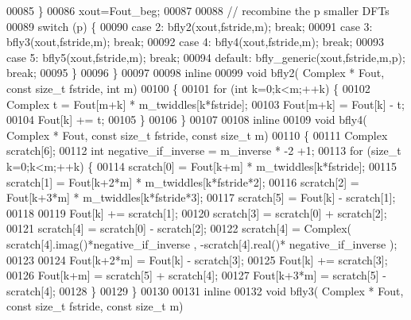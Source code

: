 \begin{DoxyCode}
00085       \}
00086       xout=Fout\_beg;
00087 
00088       \textcolor{comment}{// recombine the p smaller DFTs }
00089       \textcolor{keywordflow}{switch} (p) \{
00090         \textcolor{keywordflow}{case} 2: bfly2(xout,fstride,m); \textcolor{keywordflow}{break};
00091         \textcolor{keywordflow}{case} 3: bfly3(xout,fstride,m); \textcolor{keywordflow}{break};
00092         \textcolor{keywordflow}{case} 4: bfly4(xout,fstride,m); \textcolor{keywordflow}{break};
00093         \textcolor{keywordflow}{case} 5: bfly5(xout,fstride,m); \textcolor{keywordflow}{break};
00094         \textcolor{keywordflow}{default}: bfly\_generic(xout,fstride,m,p); \textcolor{keywordflow}{break};
00095       \}
00096     \}
00097 
00098   \textcolor{keyword}{inline}
00099     \textcolor{keywordtype}{void} bfly2( Complex * Fout, \textcolor{keyword}{const} \textcolor{keywordtype}{size\_t} fstride, \textcolor{keywordtype}{int} m)
00100     \{
00101       \textcolor{keywordflow}{for} (\textcolor{keywordtype}{int} k=0;k<m;++k) \{
00102         Complex t = Fout[m+k] * m\_twiddles[k*fstride];
00103         Fout[m+k] = Fout[k] - t;
00104         Fout[k] += t;
00105       \}
00106     \}
00107 
00108   \textcolor{keyword}{inline}
00109     \textcolor{keywordtype}{void} bfly4( Complex * Fout, \textcolor{keyword}{const} \textcolor{keywordtype}{size\_t} fstride, \textcolor{keyword}{const} \textcolor{keywordtype}{size\_t} m)
00110     \{
00111       Complex scratch[6];
00112       \textcolor{keywordtype}{int} negative\_if\_inverse = m\_inverse * -2 +1;
00113       \textcolor{keywordflow}{for} (\textcolor{keywordtype}{size\_t} k=0;k<m;++k) \{
00114         scratch[0] = Fout[k+m] * m\_twiddles[k*fstride];
00115         scratch[1] = Fout[k+2*m] * m\_twiddles[k*fstride*2];
00116         scratch[2] = Fout[k+3*m] * m\_twiddles[k*fstride*3];
00117         scratch[5] = Fout[k] - scratch[1];
00118 
00119         Fout[k] += scratch[1];
00120         scratch[3] = scratch[0] + scratch[2];
00121         scratch[4] = scratch[0] - scratch[2];
00122         scratch[4] = Complex( scratch[4].imag()*negative\_if\_inverse , -scratch[4].real()* 
      negative\_if\_inverse );
00123 
00124         Fout[k+2*m]  = Fout[k] - scratch[3];
00125         Fout[k] += scratch[3];
00126         Fout[k+m] = scratch[5] + scratch[4];
00127         Fout[k+3*m] = scratch[5] - scratch[4];
00128       \}
00129     \}
00130 
00131   \textcolor{keyword}{inline}
00132     \textcolor{keywordtype}{void} bfly3( Complex * Fout, \textcolor{keyword}{const} \textcolor{keywordtype}{size\_t} fstride, \textcolor{keyword}{const} \textcolor{keywordtype}{size\_t} m)

\end{DoxyCode}
